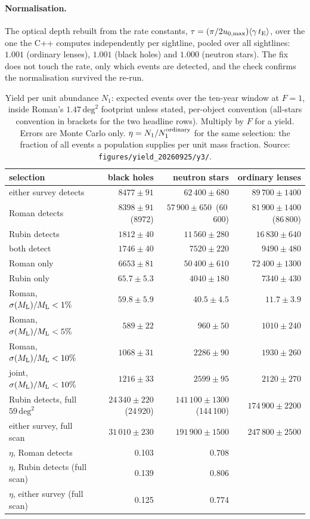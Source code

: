 \documentclass[english,10pt,a4paper]{article}
\newcommand{\tE}{t_{\rm E}}
\newcommand{\Ml}{M_{\rm L}}
\begin{document}
\paragraph{Normalisation.} The optical depth rebuilt from the rate constants,
$\tau = (\pi/2u_{0,\max})\langle\gamma\,\tE\rangle$, over the one the C++ computes independently
per sightline, pooled over all sightlines: $1.001$ (ordinary lenses), $1.001$ (black holes) and
$1.000$ (neutron stars). The fix does not touch the rate, only which events are detected, and the
check confirms the normalisation survived the re-run.

\begin{table}[h]
\centering
\caption{Yield per unit abundance $N_1$: expected events over the ten-year window at $F=1$,
inside Roman's $1.47\,\mathrm{deg}^2$ footprint unless stated, per-object convention (all-stars
convention in brackets for the two headline rows). Multiply by $F$ for a yield. Errors are Monte
Carlo only. $\eta = N_1/N_1^{\rm ordinary}$ for the same selection: the fraction of all events a
population supplies per unit mass fraction. Source: \texttt{figures/yield\_20260925/y3/}.}
\label{tab:n1}
\small
\begin{tabular}{lrrr}
\toprule
selection & black holes & neutron stars & ordinary lenses \\
\midrule
either survey detects         & $8477\pm91$  & $62\,400\pm680$ & $89\,700\pm1400$ \\
Roman detects                 & $8398\pm91$\ (8972) & $57\,900\pm650$\ (60\,600) & $81\,900\pm1400$\ (86\,800) \\
Rubin detects                 & $1812\pm40$  & $11\,560\pm280$ & $16\,830\pm640$ \\
both detect                   & $1746\pm40$  & $7520\pm220$    & $9490\pm480$ \\
Roman only                    & $6653\pm81$  & $50\,400\pm610$ & $72\,400\pm1300$ \\
Rubin only                    & $65.7\pm5.3$ & $4040\pm180$    & $7340\pm430$ \\
Roman, $\sigma(\Ml)/\Ml<1\%$  & $59.8\pm5.9$ & $40.5\pm4.5$    & $11.7\pm3.9$ \\
Roman, $\sigma(\Ml)/\Ml<5\%$  & $589\pm22$   & $960\pm50$      & $1010\pm240$ \\
Roman, $\sigma(\Ml)/\Ml<10\%$ & $1068\pm31$  & $2286\pm90$     & $1930\pm260$ \\
joint, $\sigma(\Ml)/\Ml<10\%$ & $1216\pm33$  & $2599\pm95$     & $2120\pm270$ \\
\midrule
Rubin detects, full $59\,\mathrm{deg}^2$ & $24\,340\pm220$\ (24\,920) & $141\,100\pm1300$\ (144\,100) & $174\,900\pm2200$ \\
either survey, full scan & $31\,010\pm230$ & $191\,900\pm1500$ & $247\,800\pm2500$ \\
\midrule
$\eta$, Roman detects             & 0.103 & 0.708 & \\
$\eta$, Rubin detects (full scan) & 0.139 & 0.806 & \\
$\eta$, either survey (full scan) & 0.125 & 0.774 & \\
\bottomrule
\end{tabular}
\end{table}
\end{document}
